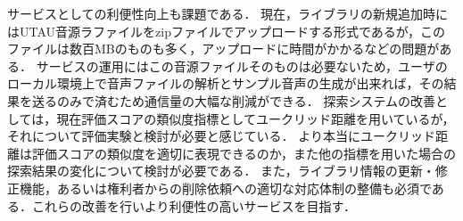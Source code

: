 サービスとしての利便性向上も課題である．
現在，ライブラリの新規追加時にはUTAU音源ラファイルをzipファイルでアップロードする形式であるが，このファイルは数百MBのものも多く，アップロードに時間がかかるなどの問題がある．
サービスの運用にはこの音源ファイルそのものは必要ないため，ユーザのローカル環境上で音声ファイルの解析とサンプル音声の生成が出来れば，その結果を送るのみで済むため通信量の大幅な削減ができる．
探索システムの改善としては，現在評価スコアの類似度指標としてユークリッド距離を用いているが，それについて評価実験と検討が必要と感じている．
より本当にユークリッド距離は評価スコアの類似度を適切に表現できるのか，また他の指標を用いた場合の探索結果の変化について検討が必要である．
また，ライブラリ情報の更新・修正機能，あるいは権利者からの削除依頼への適切な対応体制の整備も必須である．これらの改善を行いより利便性の高いサービスを目指す．

